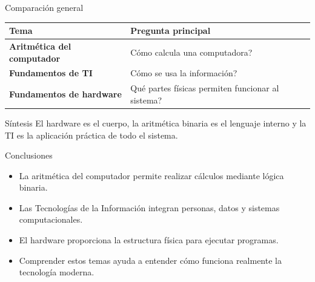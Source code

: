 \documentclass[10pt, aspectratio=169]{beamer}
\begin{document}
	\begin{frame}{Comparación general}
		
		\small
		
		\begin{center}
			
			\begin{tabular}{>{\bfseries}p{3.2cm} p{8cm}}
				
				\toprule
				Tema & Pregunta principal \\
				\midrule
				Aritmética del computador & Cómo calcula una computadora? \\
				Fundamentos de TI & Cómo se usa la información? \\
				Fundamentos de hardware & Qué partes físicas permiten funcionar al sistema? \\
				\bottomrule
				
			\end{tabular}
			
		\end{center}
		
		\vspace{0.3cm}
		
		\begin{block}{Síntesis}
			El hardware es el cuerpo, la aritmética binaria es el lenguaje interno y la TI es la aplicación práctica de todo el sistema.
		\end{block}
		
	\end{frame}
	
	\begin{frame}{Conclusiones}
		
		\begin{itemize}
			\item La aritmética del computador permite realizar cálculos mediante lógica binaria.
			\item Las Tecnologías de la Información integran personas, datos y sistemas computacionales.
			\item El hardware proporciona la estructura física para ejecutar programas.
			\item Comprender estos temas ayuda a entender cómo funciona realmente la tecnología moderna.
		\end{itemize}
		
	\end{frame}
	
\end{document}
